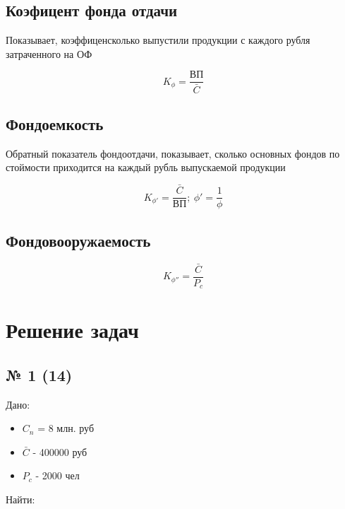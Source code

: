 \documentclass[11pt]{article}
\begin{document}
\subsection{Коэфицент фонда отдачи}
\label{sec:org65db773}

Показывает, коэффиценсколько выпустили продукции с каждого рубля затраченного на ОФ


\begin{equation}
  K_{\phi} = \frac{\text{ВП}}{\bar{C}}
\end{equation}

\subsection{Фондоемкость}
\label{sec:org7b1d167}

Обратный показатель фондоотдачи, показывает, сколько основных фондов по стоймости приходится на каждый рубль выпускаемой продукции


\begin{equation}
  K_{\phi'} = \frac{\bar{C}}{\text{ВП}}; \ \phi' = \frac{1}{\phi}
\end{equation}


\subsection{Фондовооружаемость}
\label{sec:org5368603}

\begin{equation}
  K_{\phi''} = \frac{\bar{C}}{P_{c}}
\end{equation}

\section{Решение задач}
\label{sec:org1f426a3}
\subsection{№ 1 (14)}
\label{sec:orgcbf8e7f}

Дано:

\begin{itemize}
\item \(C_{n}\) = 8 млн. руб
\item \(\bar{C}\) - 400000 руб
\item \(P_{c}\) - 2000 чел
\end{itemize}

Найти:
\end{document}
